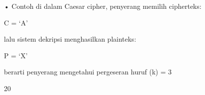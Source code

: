 \documentclass{article}
\begin{document}

• Contoh di dalam Caesar cipher, penyerang memilih cipherteks:

               C = ‘A’ 

   lalu sistem dekripsi menghasilkan plainteks:

               P = ‘X’

   berarti penyerang mengetahui pergeseran huruf (k) = 3

20
\end{document}
